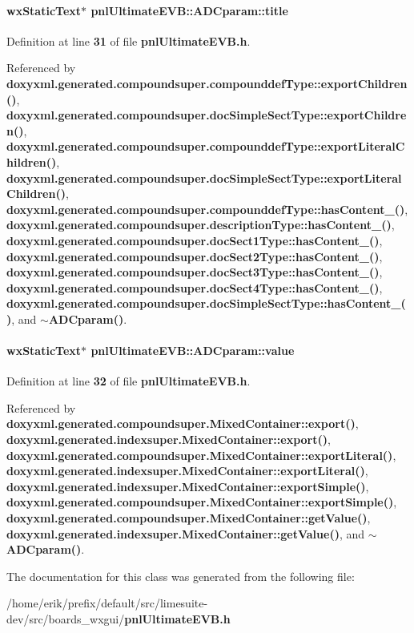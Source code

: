 \paragraph[{title}]{\setlength{\rightskip}{0pt plus 5cm}wx\+Static\+Text$\ast$ pnl\+Ultimate\+E\+V\+B\+::\+A\+D\+Cparam\+::title}\label{classpnlUltimateEVB_1_1ADCparam_ab7e3df94b8d4ef39f4805bc89918a376}


Definition at line {\bf 31} of file {\bf pnl\+Ultimate\+E\+V\+B.\+h}.



Referenced by {\bf doxyxml.\+generated.\+compoundsuper.\+compounddef\+Type\+::export\+Children()}, {\bf doxyxml.\+generated.\+compoundsuper.\+doc\+Simple\+Sect\+Type\+::export\+Children()}, {\bf doxyxml.\+generated.\+compoundsuper.\+compounddef\+Type\+::export\+Literal\+Children()}, {\bf doxyxml.\+generated.\+compoundsuper.\+doc\+Simple\+Sect\+Type\+::export\+Literal\+Children()}, {\bf doxyxml.\+generated.\+compoundsuper.\+compounddef\+Type\+::has\+Content\+\_\+()}, {\bf doxyxml.\+generated.\+compoundsuper.\+description\+Type\+::has\+Content\+\_\+()}, {\bf doxyxml.\+generated.\+compoundsuper.\+doc\+Sect1\+Type\+::has\+Content\+\_\+()}, {\bf doxyxml.\+generated.\+compoundsuper.\+doc\+Sect2\+Type\+::has\+Content\+\_\+()}, {\bf doxyxml.\+generated.\+compoundsuper.\+doc\+Sect3\+Type\+::has\+Content\+\_\+()}, {\bf doxyxml.\+generated.\+compoundsuper.\+doc\+Sect4\+Type\+::has\+Content\+\_\+()}, {\bf doxyxml.\+generated.\+compoundsuper.\+doc\+Simple\+Sect\+Type\+::has\+Content\+\_\+()}, and {\bf $\sim$\+A\+D\+Cparam()}.

\paragraph[{value}]{\setlength{\rightskip}{0pt plus 5cm}wx\+Static\+Text$\ast$ pnl\+Ultimate\+E\+V\+B\+::\+A\+D\+Cparam\+::value}\label{classpnlUltimateEVB_1_1ADCparam_a81196f2b7e28da42cc6406dc7b04c30a}


Definition at line {\bf 32} of file {\bf pnl\+Ultimate\+E\+V\+B.\+h}.



Referenced by {\bf doxyxml.\+generated.\+compoundsuper.\+Mixed\+Container\+::export()}, {\bf doxyxml.\+generated.\+indexsuper.\+Mixed\+Container\+::export()}, {\bf doxyxml.\+generated.\+compoundsuper.\+Mixed\+Container\+::export\+Literal()}, {\bf doxyxml.\+generated.\+indexsuper.\+Mixed\+Container\+::export\+Literal()}, {\bf doxyxml.\+generated.\+indexsuper.\+Mixed\+Container\+::export\+Simple()}, {\bf doxyxml.\+generated.\+compoundsuper.\+Mixed\+Container\+::export\+Simple()}, {\bf doxyxml.\+generated.\+compoundsuper.\+Mixed\+Container\+::get\+Value()}, {\bf doxyxml.\+generated.\+indexsuper.\+Mixed\+Container\+::get\+Value()}, and {\bf $\sim$\+A\+D\+Cparam()}.



The documentation for this class was generated from the following file\+:\begin{DoxyCompactItemize}
\item 
/home/erik/prefix/default/src/limesuite-\/dev/src/boards\+\_\+wxgui/{\bf pnl\+Ultimate\+E\+V\+B.\+h}\end{DoxyCompactItemize}
